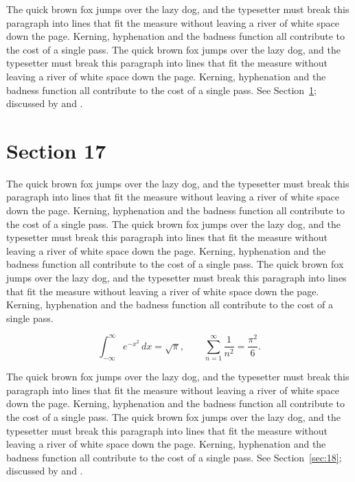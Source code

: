 \documentclass{article}
\begin{document}
The quick brown fox jumps over the lazy dog, and the typesetter must break this paragraph into lines that fit the measure without leaving a river of white space down the page. Kerning, hyphenation and the badness function all contribute to the cost of a single pass. The quick brown fox jumps over the lazy dog, and the typesetter must break this paragraph into lines that fit the measure without leaving a river of white space down the page. Kerning, hyphenation and the badness function all contribute to the cost of a single pass. 
See Section~\ref{sec:17}; discussed by \textcite{k2} and \textcite{l4}.
\section{Section 17}
\label{sec:17}
The quick brown fox jumps over the lazy dog, and the typesetter must break this paragraph into lines that fit the measure without leaving a river of white space down the page. Kerning, hyphenation and the badness function all contribute to the cost of a single pass. The quick brown fox jumps over the lazy dog, and the typesetter must break this paragraph into lines that fit the measure without leaving a river of white space down the page. Kerning, hyphenation and the badness function all contribute to the cost of a single pass. The quick brown fox jumps over the lazy dog, and the typesetter must break this paragraph into lines that fit the measure without leaving a river of white space down the page. Kerning, hyphenation and the badness function all contribute to the cost of a single pass. 

\begin{equation}\label{eq:17}
\int_{-\infty}^{\infty} e^{-x^{2}}\,dx = \sqrt{\pi}, \qquad
\sum_{n=1}^{\infty} \frac{1}{n^{2}} = \frac{\pi^{2}}{6}.
\end{equation}

The quick brown fox jumps over the lazy dog, and the typesetter must break this paragraph into lines that fit the measure without leaving a river of white space down the page. Kerning, hyphenation and the badness function all contribute to the cost of a single pass. The quick brown fox jumps over the lazy dog, and the typesetter must break this paragraph into lines that fit the measure without leaving a river of white space down the page. Kerning, hyphenation and the badness function all contribute to the cost of a single pass. 
See Section~\ref{sec:18}; discussed by \textcite{k3} and \textcite{l5}.
\end{document}
